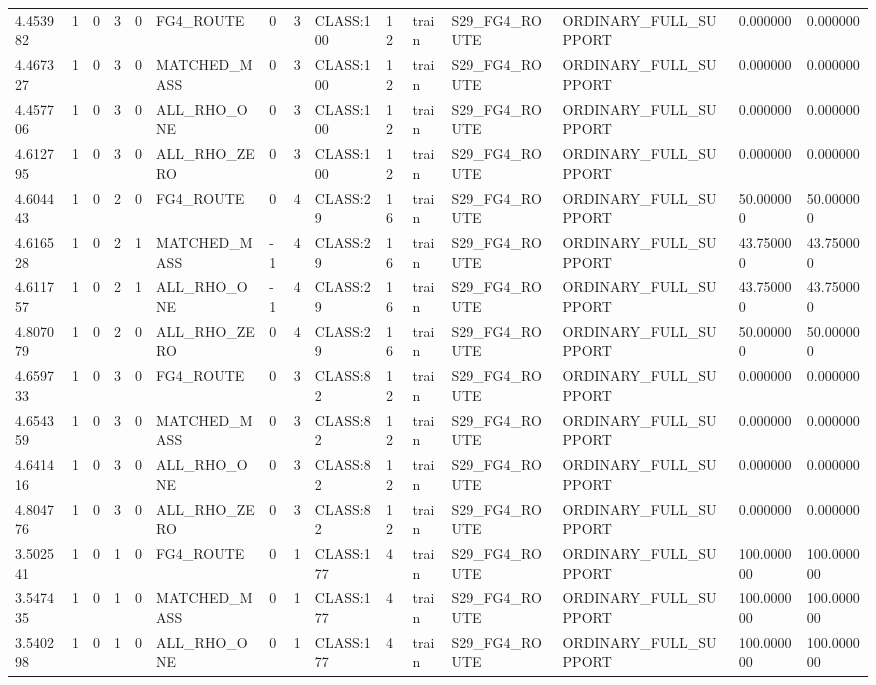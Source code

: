 \begin{tabular}{lllllllllllllll}
4.453982 & 1 & 0 & 3 & 0 & FG4\_ROUTE & 0 & 3 & CLASS:100 & 12 & train & S29\_FG4\_ROUTE & ORDINARY\_FULL\_SUPPORT & 0.000000 & 0.000000 \\
4.467327 & 1 & 0 & 3 & 0 & MATCHED\_MASS & 0 & 3 & CLASS:100 & 12 & train & S29\_FG4\_ROUTE & ORDINARY\_FULL\_SUPPORT & 0.000000 & 0.000000 \\
4.457706 & 1 & 0 & 3 & 0 & ALL\_RHO\_ONE & 0 & 3 & CLASS:100 & 12 & train & S29\_FG4\_ROUTE & ORDINARY\_FULL\_SUPPORT & 0.000000 & 0.000000 \\
4.612795 & 1 & 0 & 3 & 0 & ALL\_RHO\_ZERO & 0 & 3 & CLASS:100 & 12 & train & S29\_FG4\_ROUTE & ORDINARY\_FULL\_SUPPORT & 0.000000 & 0.000000 \\
4.604443 & 1 & 0 & 2 & 0 & FG4\_ROUTE & 0 & 4 & CLASS:29 & 16 & train & S29\_FG4\_ROUTE & ORDINARY\_FULL\_SUPPORT & 50.000000 & 50.000000 \\
4.616528 & 1 & 0 & 2 & 1 & MATCHED\_MASS & -1 & 4 & CLASS:29 & 16 & train & S29\_FG4\_ROUTE & ORDINARY\_FULL\_SUPPORT & 43.750000 & 43.750000 \\
4.611757 & 1 & 0 & 2 & 1 & ALL\_RHO\_ONE & -1 & 4 & CLASS:29 & 16 & train & S29\_FG4\_ROUTE & ORDINARY\_FULL\_SUPPORT & 43.750000 & 43.750000 \\
4.807079 & 1 & 0 & 2 & 0 & ALL\_RHO\_ZERO & 0 & 4 & CLASS:29 & 16 & train & S29\_FG4\_ROUTE & ORDINARY\_FULL\_SUPPORT & 50.000000 & 50.000000 \\
4.659733 & 1 & 0 & 3 & 0 & FG4\_ROUTE & 0 & 3 & CLASS:82 & 12 & train & S29\_FG4\_ROUTE & ORDINARY\_FULL\_SUPPORT & 0.000000 & 0.000000 \\
4.654359 & 1 & 0 & 3 & 0 & MATCHED\_MASS & 0 & 3 & CLASS:82 & 12 & train & S29\_FG4\_ROUTE & ORDINARY\_FULL\_SUPPORT & 0.000000 & 0.000000 \\
4.641416 & 1 & 0 & 3 & 0 & ALL\_RHO\_ONE & 0 & 3 & CLASS:82 & 12 & train & S29\_FG4\_ROUTE & ORDINARY\_FULL\_SUPPORT & 0.000000 & 0.000000 \\
4.804776 & 1 & 0 & 3 & 0 & ALL\_RHO\_ZERO & 0 & 3 & CLASS:82 & 12 & train & S29\_FG4\_ROUTE & ORDINARY\_FULL\_SUPPORT & 0.000000 & 0.000000 \\
3.502541 & 1 & 0 & 1 & 0 & FG4\_ROUTE & 0 & 1 & CLASS:177 & 4 & train & S29\_FG4\_ROUTE & ORDINARY\_FULL\_SUPPORT & 100.000000 & 100.000000 \\
3.547435 & 1 & 0 & 1 & 0 & MATCHED\_MASS & 0 & 1 & CLASS:177 & 4 & train & S29\_FG4\_ROUTE & ORDINARY\_FULL\_SUPPORT & 100.000000 & 100.000000 \\
3.540298 & 1 & 0 & 1 & 0 & ALL\_RHO\_ONE & 0 & 1 & CLASS:177 & 4 & train & S29\_FG4\_ROUTE & ORDINARY\_FULL\_SUPPORT & 100.000000 & 100.000000 \\

\end{tabular}
